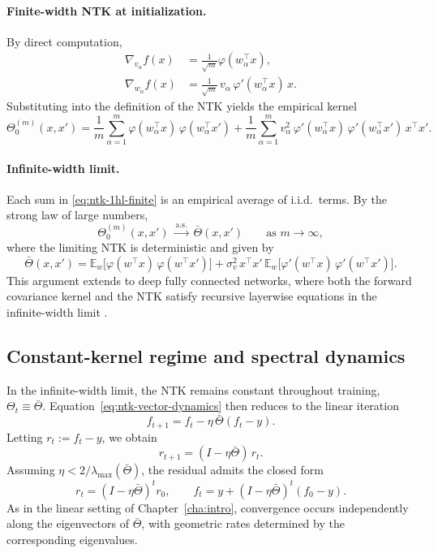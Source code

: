 \paragraph{Finite-width NTK at initialization.}
By direct computation,
\begin{align}
	\nabla_{v_\alpha} f(x)
	 & = \frac{1}{\sqrt{m}}\varphi(w_\alpha^\top x),                 \\
	\nabla_{w_\alpha} f(x)
	 & = \frac{1}{\sqrt{m}}\,v_\alpha\,\varphi'(w_\alpha^\top x)\,x.
\end{align}
Substituting into the definition of the NTK yields the empirical kernel
\begin{equation}
	\Theta_0^{(m)}(x,x')
	=
	\frac{1}{m}\sum_{\alpha=1}^m
	\varphi(w_\alpha^\top x)\,\varphi(w_\alpha^\top x')
	+
	\frac{1}{m}\sum_{\alpha=1}^m
	v_\alpha^2\,
	\varphi'(w_\alpha^\top x)\,
	\varphi'(w_\alpha^\top x')\,
	x^\top x'.
	\label{eq:ntk-1hl-finite}
\end{equation}

\paragraph{Infinite-width limit.}
Each sum in \eqref{eq:ntk-1hl-finite} is an empirical average of i.i.d.\ terms.
By the strong law of large numbers,
\[
	\Theta_0^{(m)}(x,x')
	\;\xrightarrow{\text{a.s.}}\;
	\bar\Theta(x,x')
	\qquad \text{as } m \to \infty,
\]
where the limiting NTK is deterministic and given by
\begin{equation}
	\bar\Theta(x,x')
	=
	\mathbb{E}_{w}\!\big[\varphi(w^\top x)\,\varphi(w^\top x')\big]
	+
	\sigma_v^2\,x^\top x'\,
	\mathbb{E}_{w}\!\big[\varphi'(w^\top x)\,\varphi'(w^\top x')\big].
	\label{eq:ntk-1hl-infinite}
\end{equation}
This argument extends to deep fully connected networks, where both the forward
covariance kernel and the NTK satisfy recursive layerwise equations in the
infinite-width limit \citep{jacot2018ntk, lee2020wide}.

\subsection{Constant-kernel regime and spectral dynamics}\label{sec:ntk-spectral-dynamics}

In the infinite-width limit, the NTK remains constant throughout training,
$\Theta_t \equiv \bar\Theta$. Equation~\eqref{eq:ntk-vector-dynamics} then reduces
to the linear iteration
\begin{equation}
	f_{t+1} = f_t - \eta\,\bar\Theta (f_t - y).
	\label{eq:ntk-constant-kernel}
\end{equation}
Letting $r_t := f_t - y$, we obtain
\[
	r_{t+1} = (I - \eta \bar\Theta)\,r_t.
\]
Assuming $\eta < 2/\lambda_{\max}(\bar\Theta)$, the residual admits the closed
form
\begin{equation}
	r_t = (I - \eta \bar\Theta)^t r_0,
	\qquad
	f_t = y + (I - \eta \bar\Theta)^t (f_0 - y).
	\label{eq:ntk-solution}
\end{equation}
As in the linear setting of Chapter~\ref{cha:intro}, convergence occurs
independently along the eigenvectors of $\bar\Theta$, with geometric rates
determined by the corresponding eigenvalues.

